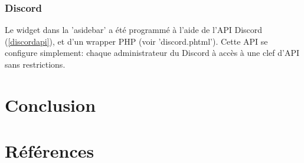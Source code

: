 \documentclass[10pt]{article}
\begin{document}
      \subsubsection{Discord}
	Le widget dans la 'asidebar' a été programmé à l'aide de l'API Discord (\ref{discordapi}), et d'un wrapper PHP (voir 'discord.phtml').
	Cette API se configure simplement: chaque administrateur du Discord à accès à une clef d'API sans restrictions.
  
  \newpage
  \section{Conclusion}
  \newpage
  \section{Références}
\end{document}
